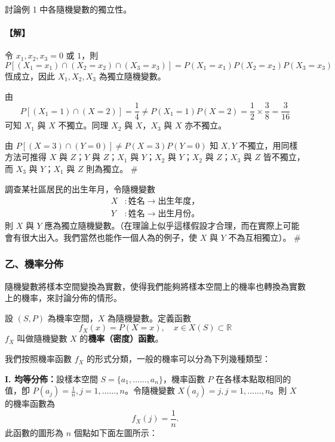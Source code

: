 \medskip
\begin{example}\label{ex:b5-5-4}
討論例 1 中各隨機變數的獨立性。
\end{example}
\paragraph{【解】}
令 $x_1, x_2, x_3 = 0$ 或 $1$，則
\[
P[(X_1 = x_1) \cap (X_2 = x_2) \cap (X_3 = x_3)] = P(X_1 = x_1) P(X_2 = x_2) P(X_3 = x_3)
\]
恆成立，因此 $X_1, X_2, X_3$ 為獨立隨機變數。

由
\[
P[(X_1 = 1) \cap (X = 2)] = \frac{1}{4} \ne P(X_1 = 1) P(X = 2) = \frac{1}{2} \times \frac{3}{8} = \frac{3}{16}
\]
可知 $X_1$ 與 $X$ 不獨立。同理 $X_2$ 與 $X$，$X_3$ 與 $X$ 亦不獨立。

由 $P[(X = 3) \cap (Y = 0)] \ne P(X = 3) P(Y = 0)$ 知 $X, Y$ 不獨立，用同樣方法可推得 $X$ 與 $Z$；$Y$ 與 $Z$；$X_1$ 與 $Y$；$X_2$ 與 $Y$；$X_2$ 與 $Z$；$X_3$ 與 $Z$ 皆不獨立，而 $X_3$ 與 $Y$；$X_1$ 與 $Z$ 則為獨立。 \hfill $\#$

\medskip
\begin{example}\label{ex:b5-5-5}
調查某社區居民的出生年月，令隨機變數
\begin{align*}
X &\colon \text{姓名} \longrightarrow \text{出生年度，} \\
Y &\colon \text{姓名} \longrightarrow \text{出生月份。}
\end{align*}
則 $X$ 與 $Y$ 應為獨立隨機變數。（在理論上似乎這樣假設才合理，而在實際上可能會有很大出入。我們當然也能作一個人為的例子，使 $X$ 與 $Y$ 不為互相獨立）。 \hfill $\#$
\end{example}

\subsubsection*{乙、機率分佈}

隨機變數將樣本空間變換為實數，使得我們能夠將樣本空間上的機率也轉換為實數上的機率，來討論分佈的情形。

\medskip
\begin{definition*}
設 $(S, P)$ 為機率空間，$X$ 為隨機變數。定義函數
\[
f_X(x) = P(X = x), \quad x \in X(S) \subset \mathbb{R}
\]
$f_X$ 叫做隨機變數 $X$ 的\textbf{機率（密度）函數}。
\end{definition*}

我們按照機率函數 $f_X$ 的形式分類，一般的機率可以分為下列幾種類型：

\medskip
\noindent\textbf{I. 均等分佈：}設樣本空間 $S = \{a_1, \dots\dots, a_n\}$，機率函數 $P$ 在各樣本點取相同的值，卽 $P(a_j) = \frac{1}{n}, j = 1, \dots\dots, n$。令隨機變數 $X(a_j) = j, j = 1, \dots\dots, n$。則 $X$ 的機率函數為
\[
f_X(j) = \frac{1}{n}.
\]
此函數的圖形為 $n$ 個點如下面左圖所示：

